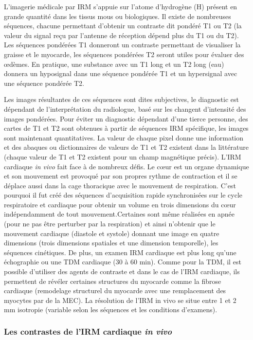  L’imagerie médicale par IRM s’appuie sur l’atome d’hydrogène (H) présent en grande quantité dans les tissus mous ou biologiques. Il existe de nombreuses séquences, chacune permettant d’obtenir un contraste dit pondéré T1 ou T2 (la valeur du signal reçu par l’antenne de réception dépend plus du T1 ou du T2).  Les séquences pondérées T1 donneront un contraste permettant de visualiser la graisse et le myocarde, les séquences pondérées T2 seront utiles pour évaluer des œdèmes. En pratique, une substance avec un T1 long et un T2 long (eau) donnera un hyposignal dans une séquence pondérée T1 et un hypersignal avec une séquence pondérée T2.

Les images résultantes de ces séquences sont dites subjectives, le diagnostic est dépendant de l’interprétation du radiologue, basé sur les changent d’intensité des images pondérées. Pour éviter un diagnostic dépendant d’une tierce personne, des cartes de T1 et T2 sont obtenues à partir de séquences IRM spécifique, les images sont maintenant quantitatives. La valeur de chaque pixel donne une information et des abaques ou dictionnaires de valeurs de T1 et T2 existent dans la littérature (chaque valeur de T1 et T2 existent pour un champ magnétique précis).
\text
L’IRM cardiaque \textit{in vivo} fait face à de nombreux défis. Le cœur est un organe dynamique et son mouvement est provoqué par son propres rythme de contraction et il se déplace aussi dans la cage thoracique avec le mouvement de respiration. C’est pourquoi il fut créé des séquences d’acquisition rapide synchronisées sur le cycle respiratoire et cardiaque pour obtenir un volume en trois dimensions du cœur indépendamment de tout mouvement.Certaines sont même réalisées en apnée (pour ne pas être perturber par la respiration) et ainsi n’obtenir que le mouvement cardiaque (diastole et systole) donnant une image en quatre dimensions (trois dimensions spatiales et une dimension temporelle), les séquences cinétiques. De plus, un examen IRM cardiaque est plus long qu’une échographie ou une TDM cardiaque (30 à 60 min). Comme pour la TDM, il est possible d’utiliser des agents de contraste et dans le cas de l’IRM cardiaque, ils permettent de révéler certaines structures du myocarde comme la fibrose cardiaque (remodelage structurel du myocarde avec une remplacement des myocytes par de la MEC). La résolution de l’IRM in vivo se situe entre 1 et 2 mm isotropie (variable selon les séquences et les conditions d’examens).

\subsubsection{Les contrastes de l’IRM cardiaque \textit{in vivo}}

